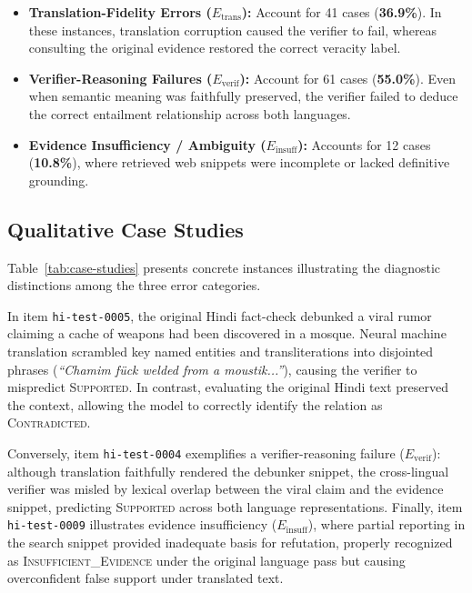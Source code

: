 \documentclass[11pt,a4paper]{article}
\begin{document}
\begin{itemize}
    \item \textbf{Translation-Fidelity Errors ($E_{\text{trans}}$):} Account for 41 cases (\textbf{36.9\%}). In these instances, translation corruption caused the verifier to fail, whereas consulting the original evidence restored the correct veracity label.
    \item \textbf{Verifier-Reasoning Failures ($E_{\text{verif}}$):} Account for 61 cases (\textbf{55.0\%}). Even when semantic meaning was faithfully preserved, the verifier failed to deduce the correct entailment relationship across both languages.
    \item \textbf{Evidence Insufficiency / Ambiguity ($E_{\text{insuff}}$):} Accounts for 12 cases (\textbf{10.8\%}), where retrieved web snippets were incomplete or lacked definitive grounding.
\end{itemize}

\subsection{Qualitative Case Studies}
Table~\ref{tab:case-studies} presents concrete instances illustrating the diagnostic distinctions among the three error categories.


In item \texttt{hi-test-0005}, the original Hindi fact-check debunked a viral rumor claiming a cache of weapons had been discovered in a mosque. Neural machine translation scrambled key named entities and transliterations into disjointed phrases (\emph{``Chamim f{\"u}ck welded from a moustik...''}), causing the verifier to mispredict \textsc{Supported}. In contrast, evaluating the original Hindi text preserved the context, allowing the model to correctly identify the relation as \textsc{Contradicted}.

Conversely, item \texttt{hi-test-0004} exemplifies a verifier-reasoning failure ($E_{\text{verif}}$): although translation faithfully rendered the debunker snippet, the cross-lingual verifier was misled by lexical overlap between the viral claim and the evidence snippet, predicting \textsc{Supported} across both language representations. Finally, item \texttt{hi-test-0009} illustrates evidence insufficiency ($E_{\text{insuff}}$), where partial reporting in the search snippet provided inadequate basis for refutation, properly recognized as \textsc{Insufficient\_Evidence} under the original language pass but causing overconfident false support under translated text.
\end{document}
